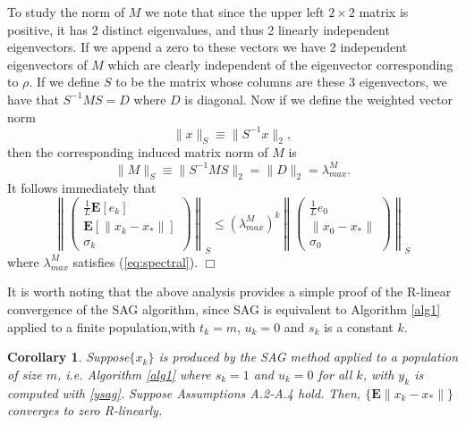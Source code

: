 \documentclass[11pt]{article}
\newtheorem{cor}[thm]{Corollary}
\newcommand{\E}{\mathbf{E}}
\begin{document}
To study the norm of $M$ we note that since the upper left $2 \times 2$ matrix is positive, it has 2 distinct eigenvalues, and thus 2 linearly independent eigenvectors. If we append a zero to these vectors we have 2 independent eigenvectors of $M$ which are clearly independent of the eigenvector corresponding to $\rho$.  If we define $S$ to be the matrix whose columns are these 3 eigenvectors, we have that $S^{-1}MS =D$ where $D$ is diagonal. Now if we define the weighted vector norm 
\[ \|x\|_S \equiv \|S^{-1}x\|_2 ,  \]
then the corresponding induced matrix norm of $M$ is
\[
\|M\|_S \equiv  \| S^{-1}MS\|_2 = \|D\|_2= \lambda_{max}^M.
\]
It follows immediately that
\begin{equation}\label{rconv}
\left\| \begin{pmatrix} \frac{1}{L}\E[e_k]\\ \E[\|x_k-x_\ast \|] \\ \sigma_k \end{pmatrix} \right\|_S
\leq  (\lambda_{max}^M)^k
 \left\| \begin{pmatrix} \frac{1}{L}e_0 \\ \| x_0-x_\ast \| \\ \sigma_0 \end{pmatrix} \right\|_S
\end{equation}
where $ \lambda_{max}^M$ satisfies (\ref{eq:spectral}).
\hspace*{\fill}$\Box$\medskip

\bigskip

It is worth noting that the above analysis provides a simple proof of the R-linear convergence of the SAG algorithm, since SAG 
is equivalent to Algorithm \ref{alg1} applied to a finite population,with $t_k =m$, $u_k=0$  and $s_k$ is a constant $k$. 

\begin{cor}\label{thm:sag}
Suppose$\{x_k\}$ is produced by the SAG method applied to a population of size $m$, i.e. Algorithm \ref{alg1} where $s_k=1$ and $u_k=0$ for all $k$, with  $y_k$ is computed with \eqref{ysag}.
 Suppose Assumptions A.2-A.4 hold.  Then, $\{\E\|x_k-x_\ast\|\}$  converges to zero R-linearly.
\end{cor}
\end{document}

